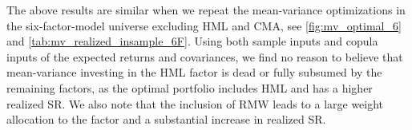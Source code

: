 The above results are similar when we repeat the mean-variance optimizations in the six-factor-model universe excluding HML and CMA, see \autoref{fig:mv_optimal_6} and \autoref{tab:mv_realized_insample_6F}. Using both sample inputs and copula inputs of the expected returns and covariances, we find no reason to believe that mean-variance investing in the HML factor is dead or fully subsumed by the remaining factors, as the optimal portfolio includes HML and has a higher realized SR. We also note that the inclusion of RMW leads to a large weight allocation to the factor and a substantial increase in realized SR.

\begin{figure}[htbp]
  \centering
  \footnotesize
  \renewcommand{\arraystretch}{1.2}
  \caption{Mean-variance optimal weights in the six-factor universe \\ \quad \\ Smoothed as 1-year moving averages. Left hand panel including and excluding HML, right hand including and excluding CMA. Based on one-week-ahead forecasts from the copula model 1963--2016.}
  \label{fig:mv_optimal_6}

  \begin{subfigure}{0.45\textwidth}


\end{subfigure}
\end{figure}
